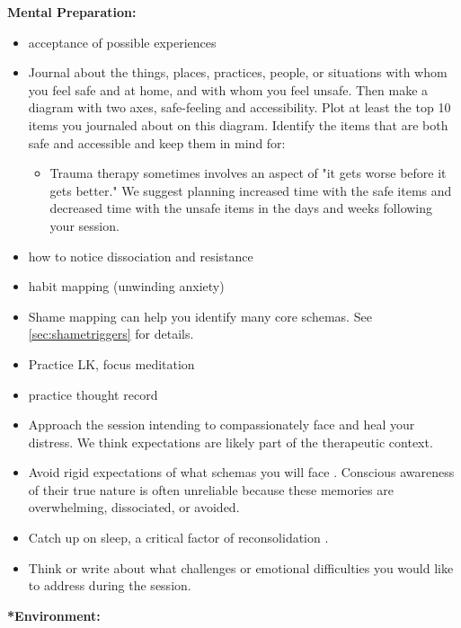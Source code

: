 \documentclass[12pt,letterpaper]{article}
\begin{document}
\noindent \textbf{Mental Preparation:}
\begin{itemize}
    \item acceptance of possible experiences
    \label{safetymapping}
    \item Journal about the things, places, practices, people, or situations with whom you feel safe and at home, and with whom you feel unsafe. Then make a diagram with two axes, safe-feeling and accessibility. Plot at least the top 10 items you journaled about on this diagram. Identify the items that are both safe and accessible and keep them in mind for:
    \begin{itemize}
        \item Trauma therapy sometimes involves an aspect of "it gets worse before it gets better." We suggest planning increased time with the safe items and decreased time with the unsafe items in the days and weeks following your session.
    \end{itemize}
    \item how to notice dissociation and resistance
    \item habit mapping (unwinding anxiety)
    \item Shame mapping can help you identify many core schemas. See \ref{sec:shametriggers} for details.
    \item Practice LK, focus meditation
    \item practice thought record
    \item Approach the session intending to compassionately face and heal your distress. We think expectations are likely part of the therapeutic context.
    \item Avoid rigid expectations of what schemas you will face \cite{mithoeferManual}. Conscious awareness of their true nature is often unreliable because these memories are overwhelming, dissociated, or avoided.
    \item Catch up on sleep, a critical factor of reconsolidation \cite{walkerSleep}.
    \item Think or write about what challenges or emotional difficulties you would like to address during the session.
\end{itemize}
\noindent \textbf{*Environment:}
\end{document}
